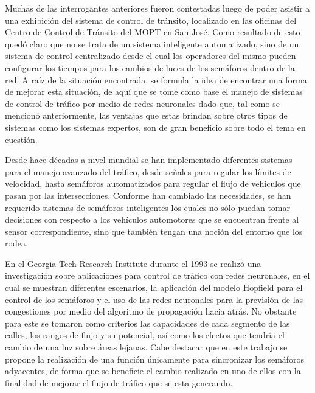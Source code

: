 		Muchas de las interrogantes anteriores fueron contestadas luego de poder
	asistir a una exhibici\'{o}n del sistema de control de tr\'{a}nsito, localizado en las
	oficinas del Centro de Control de Tr\'{a}nsito del MOPT en San Jos\'{e}. Como resultado
	de esto qued\'{o} claro que no se trata de un sistema inteligente automatizado,
	sino de un sistema de control centralizado desde el cual los operadores del
	mismo pueden configurar los tiempos para los cambios de luces de los
	sem\'{a}foros dentro de la red.  A ra\'{i}z de la situaci\'{o}n encontrada, se
	formula la idea de encontrar una forma de mejorar esta situaci\'{o}n, de aqu\'{i} que se tome como base el manejo de sistemas de control de tr\'{a}fico por medio de redes neuronales dado que, tal como se mencion\'{o} anteriormente, las ventajas que estas brindan sobre otros tipos de sistemas como los sistemas expertos, son de gran beneficio sobre todo el tema en cuesti\'{o}n.
	
		Desde hace d\'{e}cadas a nivel mundial se han implementado diferentes sistemas
	para el manejo avanzado del tr\'{a}fico, desde se\~{n}ales para regular los l\'{i}mites de
	velocidad, hasta sem\'{a}foros automatizados para regular el flujo de veh\'{i}culos que
	pasan por las intersecciones. Conforme han cambiado las necesidades, se han
	requerido sistemas de sem\'{a}foros inteligentes los cuales no s\'{o}lo puedan tomar decisiones con respecto a los veh\'{i}culos automotores que se encuentran frente al sensor correspondiente, sino que tambi\'{e}n tengan una noci\'{o}n del entorno que los rodea.

			En el Georgia Tech Research Institute durante el 1993
			se realiz\'{o} una investigaci\'{o}n sobre aplicaciones para control de tr\'{a}fico con redes neuronales,
	en el cual se muestran diferentes escenarios, la aplicaci\'{o}n del modelo
	Hopfield para el control de los sem\'{a}foros y el uso de las redes neuronales
	para la previsi\'{o}n de las congestiones por medio del algoritmo de
	propagaci\'{o}n hacia atr\'{a}s. No obstante para este se tomaron como criterios las capacidades de cada segmento de las calles, los rangos de flujo y su potencial, as\'{i} como los efectos que tendr\'{i}a el cambio de una luz sobre \'{a}reas lejanas. Cabe destacar que en este trabajo se propone la realizaci\'{o}n de una funci\'{o}n \'{u}nicamente para sincronizar los sem\'{a}foros adyacentes, de forma que se beneficie el cambio realizado en uno de ellos con la finalidad de mejorar el flujo de tr\'{a}fico que se esta generando.\cite{Gilmore1993}

